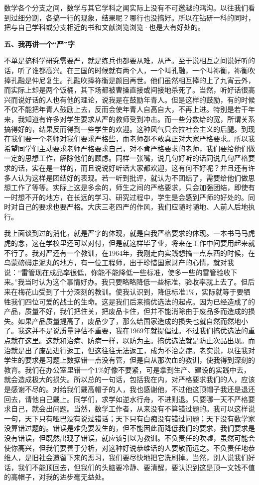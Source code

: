 \documentclass[twoside,openright,headings=optiontohead]{ctexbook} %
\begin{document}
{数学各个分支之间，数学与其它学科之闻实际上没有不可邀越的鸿沟。以往我们看到过细分割，各搞一行的现象，结果呢？哪行也没搞好。所以在钻研一科的同时，把与自己学科或分支相近的书和文献浏览浏览·也是大有好处的。

\textbf{五、我再讲一个``严''字}

不单是搞科学研究需要严，就是练兵也都要从难，从严。至于说相互之间说好听的话，听了谁都高兴。在三国的时候就有两个人，一个叫孔融，一个叫祢衡，祢衡吹捧孔融是仲尼复生。孔融吹捧祢衡是颜回再世。他们虽然相互捧的上了九宵云外，而实际上却是两个饭桶，其下场都被曹操直接或间接地杀死了。当然，听好话很高兴而说好话的人也有他的理论，说我是在鼓励年青人。但是这样的鼓励，有的时候不仅不能把年青人鼓励上去，反而会使年青人自高自大，不再上进。特别是若干年来，我知道有许多对学生要求从严的教师受到冲击。而一些分数给的宽，所谓关系搞得好的，结果反而得到一些学生的欢迎。这种风气只会拉社会主义的后腿。到现在我们要一个老师对我们要求严格些，而老师都不敢真正对大家严格要求。所以我希望同学们主动要求老师严格要求自己，对不肯严格要求的老师，我们要给他们做一定的思想工作，解除他们的顾虑。同样一张嘴，说几句好听的话同说几句严格要求的话，实在是一样的，而且说说好听话大家都欢迎，这有何不好呢？并且还有许多人认为这样是团结好的表现。若一听到批评，就认为不团结了，需要给他们做思想工作了等等。实际上这是多余的，师生之间的严格要求，只会加强团结，即使有一时想不开的地方，在长远的学习、研究过程中，学生是会感到严师的好处的。同时对自己的要求也要严格。大庆三老四严的作风，我们应随时随地、人前人后地执行。

我上面谈到过的消化，就是严字的体现，就是自我严格要求的体现。一本书马马虎虎的念，这在学校里还可以对付，但是就这样毕了业，将来在工作中间要用起来就不行了。我对严还有一个教训，在1964年，我刚走向实践想搞一点东西的时候，在乌蒙磅礴走泥丸的地方，有一位工程师，出于珍惜国家财产的心情，就对我说：``雷管现在成品率很低，你能不能降低一些标准，使多一些的雷管验收下来。''我当时认为这个事情好办。我只要略略降低一些标准，验收率就上去了。但后来在梅花山受到了十分深刻的教训。使我认识到，降低标准1\%，实际就等于要牺牲我们四位可爱的战士的生命。这是我们后来搞优选法的起点。因为已经造成了的产品，质量不好，我们把住关，把废品卡住，但并不能消除由于废品多而造成的损失。如果产品质量提高了，废品少了，那么给国家造成的损失也就自然而然地小了。我这并不是说质量评估不重要，我在1969年就提倡过。不过我们搞优选法的重点就在这里。这就和治病、防病一样，以防为主。搞优选法就是防止次品出现。而治就是出了废品进行返工，但这往往无法返工，成为不治之症。老实说，以往我对学生的要求是习题上数据错一点没有管，但是自从那次血的教训，使我得到深刻的教育。我们在办公室里错一个1\%好像不要紧，可是拿到生产、建设的实践中去，就会造成极大的损失。所以总的一句话，包括我在内，对严格要求我们的人，应该是感谢不尽的。对给我们戴高帽子的人，我也感谢他，不过他这顶帽子我还是退还回去，请他自己戴上。同学们，求学如逆水行舟，不进则退。只要哪一天不严格要求自己，就会出问题。当然，数学工作者，从来没有不算错过题的。我可以这样说一句，天下只有哑巴没有说过错话；天下只有白痴没有错过问题；天下没有数学家没算错过题的。错误是难免要发生的，但不能因此而降低我们的要求，我们要求是没有错误，但既然出现了错误，就应该引以为教训。不负责任的吹嘘，虽然可能会使你高兴，但我们要善于分析，对这种好说恭维话的人要敬而远之。不负责任地恭维人，是旧社会遗留下来的恶习，我们要尽快地把它洗刷掉。当然，别人说我们好话，我们不能顶回去，但我们的头脑要冷静、要清醒，要认识到这是顶一文钱不值的高帽子，对我的进步毫无益处。

}
\end{document}
